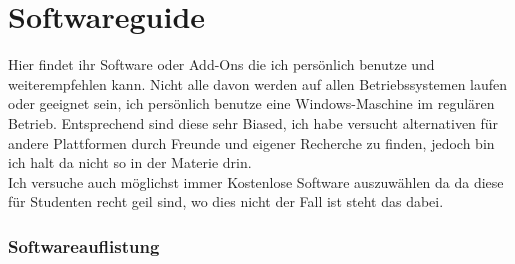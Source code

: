 \section{Softwareguide}
Hier findet ihr Software oder Add-Ons die ich persönlich benutze und weiterempfehlen kann. Nicht alle davon werden auf allen Betriebssystemen laufen oder geeignet sein, ich persönlich benutze eine Windows-Maschine im regulären Betrieb. Entsprechend sind diese sehr Biased, ich habe versucht alternativen für andere Plattformen durch Freunde und eigener Recherche zu finden, jedoch bin ich halt da nicht so in der Materie drin.\\
Ich versuche auch möglichst immer Kostenlose Software auszuwählen da da diese für Studenten recht geil sind, wo dies nicht der Fall ist steht das dabei.

\subsubsection{Softwareauflistung}
